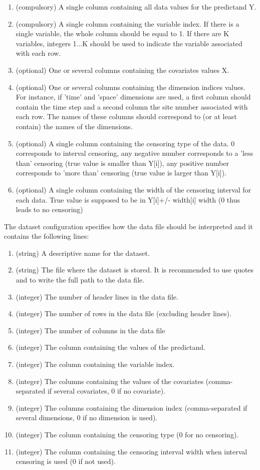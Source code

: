 \documentclass[a4paper]{article}
\begin{document}
	\begin{enumerate}
		\item (compulsory) A single column containing all data values for the predictand Y.
		\item (compulsory) A single column containing the variable index.  If there is a single variable, the whole column should be equal to 1. If there are K variables, integers 1...K should be used to indicate the variable associated with each row.
		\item (optional) One or several columns containing the covariates values X.
		\item (optional) One or several columns containing the dimension indices values. For instance, if 'time' and 'space' dimensions are used, a first column should contain the time step and a second column the site number associated with each row. The names of these columns should correspond to (or at least contain) the names of the dimensions.
		\item (optional) A single column containing the censoring type of the data. 0 corresponds to interval censoring, any negative number corresponds to a 'less than' censoring (true value is smaller than Y[i]), any positive number corresponds to 'more than' censoring (true value is larger than Y[i]).
		\item (optional) A single column containing the width of the censoring interval for each data. True value is supposed to be in Y[i]+/- width[i] width (0 thus leads to no censoring)
	\end{enumerate}
	
	The dataset configuration specifies how the data file should be interpreted and it contains the following lines:
		
	\begin{enumerate}
		\item (string) A descriptive name for the dataset.
		\item (string) The file where the dataset is stored. It is recommended to use quotes and to write the full path to the data file.
		\item (integer) The number of header lines in the data file.
		\item (integer) The number of rows in the data file (excluding header lines).
		\item (integer) The number of columns in the data file
		\item (integer) The column containing the values of the predictand.
		\item (integer) The column containing the variable index.
		\item (integer) The columns containing the values of the covariates (comma-separated if several covariates, 0 if no covariate).
		\item (integer) The columns containing the dimension index (comma-separated if several dimensions, 0 if no dimension is used).
		\item (integer) The column containing the censoring type (0 for no censoring).
		\item (integer) The column containing the censoring interval width when interval censoring is used (0 if not used).
	\end{enumerate}
	
\end{document}
